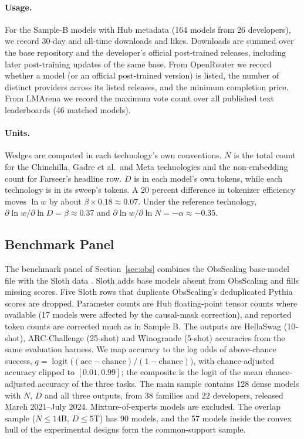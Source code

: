 \paragraph{Usage.}
For the Sample-B models with Hub metadata (164 models from 26 developers), we record 30-day and all-time downloads and
likes. Downloads are summed over the base repository and the developer's official post-trained releases, including
later post-training updates of the same base. From OpenRouter \citep{openrouter2026models} we record whether a model
(or an official post-trained version) is listed, the number of distinct providers across its listed releases, and the
minimum completion price. From LMArena \citep{lmarena2026leaderboard} we record the maximum vote count over all
published text leaderboards (46 matched models).

\paragraph{Units.}
Wedges are computed in each technology's own conventions. $N$ is the total count for the Chinchilla, Gadre et al.\
and Meta technologies and the non-embedding count for Farseer's headline row. $D$ is in each model's own tokens, while each technology
is in its sweep's tokens. A 20 percent difference in tokenizer efficiency moves $\ln w$ by about $\beta\times0.18\approx
0.07$. Under the reference technology, $\partial\ln w/\partial\ln D=\beta\approx0.37$ and
$\partial\ln w/\partial\ln N=-\alpha\approx-0.35$.

\subsection{Benchmark Panel}\label{app:obspanel}

The benchmark panel of Section~\ref{sec:obs} combines the ObsScaling base-model file with the Sloth data
\citep{maiapolo2024sloth}. Sloth adds base models absent from ObsScaling and fills missing scores. Five Sloth rows that
duplicate ObsScaling's deduplicated Pythia scores are dropped. Parameter counts are Hub floating-point tensor counts
where available (17 models were affected by the causal-mask correction), and reported token counts are corrected much
as in Sample B. The outputs are HellaSwag (10-shot), ARC-Challenge (25-shot) and Winogrande (5-shot) accuracies from the
same evaluation harness. We map accuracy to the log odds of above-chance success,
$q=\operatorname{logit}\bigl((\text{acc}-\text{chance})/(1-\text{chance})\bigr)$, with chance-adjusted accuracy
clipped to $[0.01,0.99]$; the composite is the logit of the mean chance-adjusted accuracy of the three tasks.
The main sample contains 128 dense models with $N$, $D$ and all three outputs, from 38 families and 22 developers,
released March 2021--July 2024. Mixture-of-experts models are excluded. The overlap sample ($N\le14$B, $D\le5$T)
has 90 models, and the 57 models inside the convex hull of the experimental designs form the common-support sample.

